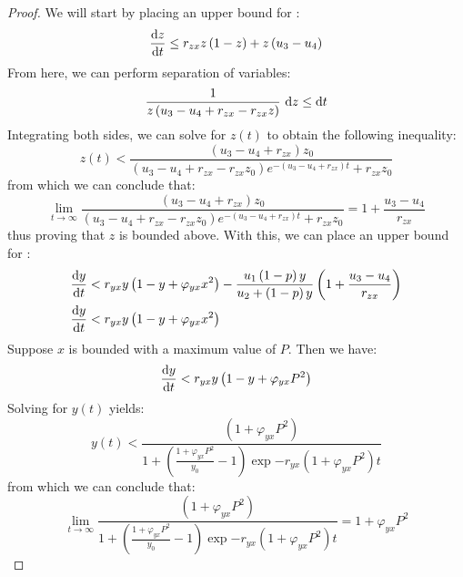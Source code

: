 \begin{proof}
    We will start by placing an upper bound for :
    \begin{equation*}
        \diff[]{z}{t} \leq r_{zx}z\left(1-z\right)+z\left(u_3-u_4\right)
    \end{equation*}
    From here, we can perform separation of variables:\
    \begin{equation*}
        \frac{1}{z\left(u_3-u_4+r_{zx}-r_{zx}z\right)}\ \opdiff{z} \leq \opdiff{t}
    \end{equation*}
    Integrating both sides, we can solve for $z(t)$ to obtain the following inequality:
    \begin{equation*}
        z(t) < \frac{\left(u_3-u_4+r_{zx}\right)z_0}{\left(u_3-u_4+r_{zx}-r_{zx}z_0\right)e^{-\left(u_3-u_4+r_{zx}\right)t}+r_{zx}z_0}
    \end{equation*}
    from which we can conclude that:
    \begin{equation*}
        \lim_{t\to\infty} \frac{\left(u_3-u_4+r_{zx}\right)z_0}{\left(u_3-u_4+r_{zx}-r_{zx}z_0\right)e^{-\left(u_3-u_4+r_{zx}\right)t}+r_{zx}z_0} = 1+\frac{u_3-u_4}{r_{zx}}
    \end{equation*}
    thus proving that $z$ is bounded above. With this, we can place an upper bound for :
    \begin{align*}
        \diff[]{y}{t} &< r_{yx}y\left(1-y+\varphi_{yx}x^2\right)-\frac{u_1\left(1-p\right)y}{u_2+\left(1-p\right)y}\left(1+\frac{u_3-u_4}{r_{zx}}\right)\\
        \diff[]{y}{t} &< r_{yx}y\left(1-y+\varphi_{yx}x^2\right)
    \end{align*}
    Suppose $x$ is bounded with a maximum value of $P$. Then we have:
    \begin{equation*}
        \diff[]{y}{t} < r_{yx}y\left(1-y+\varphi_{yx}P^2\right)
    \end{equation*}
    Solving for $y(t)$ yields:
    \begin{equation*}
        y(t) < \frac{\left(1+\varphi_{yx}P^2\right)}{1+\left(\frac{1+\varphi_{yx}P^2}{y_0}-1\right)\exp{-r_{yx}\left(1+\varphi_{yx}P^2\right)t}}
    \end{equation*}
    from which we can conclude that:
    \begin{equation*}
        \lim_{t\to\infty} \frac{\left(1+\varphi_{yx}P^2\right)}{1+\left(\frac{1+\varphi_{yx}P^2}{y_0}-1\right)\exp{-r_{yx}\left(1+\varphi_{yx}P^2\right)t}} = 1+\varphi_{yx}P^2

\end{equation*}
\end{proof}
